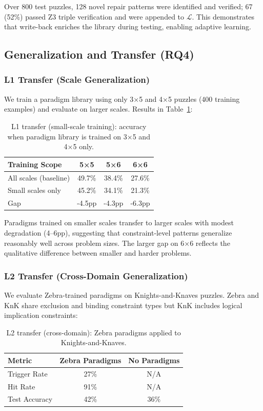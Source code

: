 Over 800 test puzzles, 128 novel repair patterns were identified and verified; 67 (52\%) passed Z3 triple verification and were appended to $\mathcal{L}$. This demonstrates that write-back enriches the library during testing, enabling adaptive learning.

\subsection{Generalization and Transfer (RQ4)}

\subsubsection{L1 Transfer (Scale Generalization)}

We train a paradigm library using only 3×5 and 4×5 puzzles (400 training examples) and evaluate on larger scales. Results in Table~\ref{tab:l1transfer}:

\begin{table}[tb]
\centering
\caption{\label{tab:l1transfer} L1 transfer (small-scale training): accuracy when paradigm library is trained on 3×5 and 4×5 only.}
\small
\begin{tabular}{l | ccc}
\hline
\textbf{Training Scope} & \textbf{5×5} & \textbf{5×6} & \textbf{6×6} \\
\hline
All scales (baseline) & 49.7\% & 38.4\% & 27.6\% \\
Small scales only & 45.2\% & 34.1\% & 21.3\% \\
Gap & -4.5pp & -4.3pp & -6.3pp \\
\hline
\end{tabular}
\end{table}

Paradigms trained on smaller scales transfer to larger scales with modest degradation (4--6pp), suggesting that constraint-level patterns generalize reasonably well across problem sizes. The larger gap on 6×6 reflects the qualitative difference between smaller and harder problems.

\subsubsection{L2 Transfer (Cross-Domain Generalization)}

We evaluate Zebra-trained paradigms on Knights-and-Knaves puzzles. Zebra and KnK share exclusion and binding constraint types but KnK includes logical implication constraints:

\begin{table}[tb]
\centering
\caption{\label{tab:l2transfer} L2 transfer (cross-domain): Zebra paradigms applied to Knights-and-Knaves.}
\small
\begin{tabular}{l | cc}
\hline
\textbf{Metric} & \textbf{Zebra Paradigms} & \textbf{No Paradigms} \\
\hline
Trigger Rate & 27\% & N/A \\
Hit Rate & 91\% & N/A \\
Test Accuracy & 42\% & 36\% \\
\hline
\end{tabular}
\end{table}

